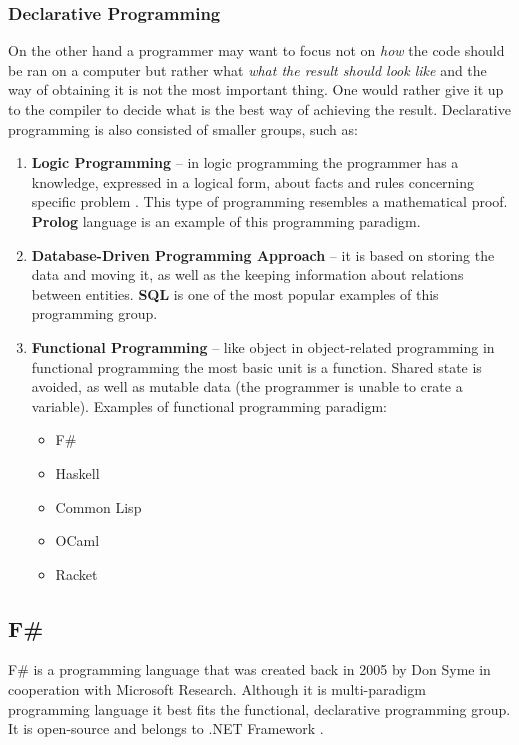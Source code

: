     \subsubsection{Declarative Programming}
    On the other hand a programmer may want to focus not on \textit{how} the code should be ran on a computer but rather what \textit{what the result should look like} and the way of obtaining it is not the most important thing. One would rather give it up to the compiler to decide what is the best way of achieving the result. Declarative programming is also consisted of smaller groups, such as:
    \begin{enumerate}
        \item \textbf{Logic Programming} -- in logic programming the programmer has a knowledge, expressed in a logical form, about facts and rules concerning specific problem \cite{logicProgramming}. This type of programming resembles a mathematical proof. \textbf{Prolog} language is an example of this programming paradigm.
        
        \item \textbf{Database-Driven Programming Approach} -- it is based on storing the data and moving it, as well as the keeping information about relations between entities. \textbf{SQL} is one of the most popular examples of this programming group.
        
        \item \textbf{Functional Programming} -- like object in object-related programming in functional programming the most basic unit is a function. Shared state is avoided, as well as mutable data (the programmer is unable to crate a variable). Examples of functional programming paradigm:
            \begin{itemize}
                \item F\#
                \item Haskell
                \item Common Lisp
                \item OCaml
                \item Racket
            \end{itemize}
    \end{enumerate}

\subsection{F\#}
    F\# is a programming language that was created back in 2005 by Don Syme in cooperation with Microsoft Research. Although it is multi-paradigm programming language it best fits the functional, declarative programming group. It is open-source and belongs to .NET Framework \cite{WhatIsFSharp} \cite{FSharpWiki}.
    
